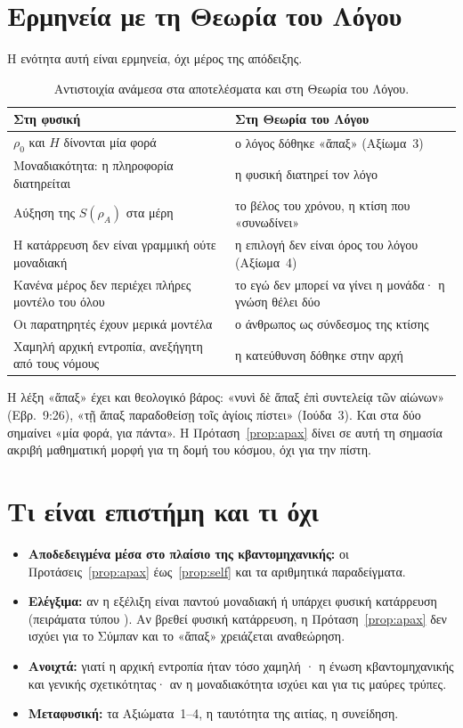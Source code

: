 \documentclass[a4paper,11pt]{article}
\theoremstyle{definition}
\begin{document}
\section{Ερμηνεία με τη Θεωρία του Λόγου}

Η ενότητα αυτή είναι ερμηνεία, όχι μέρος της απόδειξης.

\begin{table}[h]
\centering
\small
\begin{tabular}{>{\raggedright}p{} >{\raggedright\arraybackslash}p{}}
\toprule
\textbf{Στη φυσική} & \textbf{Στη Θεωρία του Λόγου} \\
\midrule
$\rho_0$ και $H$ δίνονται μία φορά & ο λόγος δόθηκε «ἅπαξ» (Αξίωμα~3) \\
Μοναδιακότητα: η πληροφορία διατηρείται & η φυσική διατηρεί τον λόγο \\
Αύξηση της $S(\rho_A)$ στα μέρη & το βέλος του χρόνου, η κτίση που «συνωδίνει» \\
Η κατάρρευση δεν είναι γραμμική ούτε μοναδιακή & η επιλογή δεν είναι όρος του λόγου (Αξίωμα~4) \\
Κανένα μέρος δεν περιέχει πλήρες μοντέλο του όλου & το εγώ δεν μπορεί να γίνει η μονάδα· η γνώση θέλει δύο \\
Οι παρατηρητές έχουν μερικά μοντέλα & ο άνθρωπος ως σύνδεσμος της κτίσης \\
Χαμηλή αρχική εντροπία, ανεξήγητη από τους νόμους & η κατεύθυνση δόθηκε στην αρχή \\
\bottomrule
\end{tabular}
\caption{Αντιστοιχία ανάμεσα στα αποτελέσματα και στη Θεωρία του Λόγου.}
\end{table}

Η λέξη «ἅπαξ» έχει και θεολογικό βάρος: «νυνὶ δὲ ἅπαξ ἐπὶ συντελείᾳ τῶν αἰώνων» (Εβρ.~9:26), «τῇ ἅπαξ παραδοθείσῃ τοῖς ἁγίοις πίστει» (Ιούδα~3). Και στα δύο σημαίνει «μία φορά, για πάντα». Η Πρόταση~\ref{prop:apax} δίνει σε αυτή τη σημασία ακριβή μαθηματική μορφή για τη δομή του κόσμου, όχι για την πίστη.

\section{Τι είναι επιστήμη και τι όχι}

\begin{itemize}
\item \textbf{Αποδεδειγμένα μέσα στο πλαίσιο της κβαντομηχανικής:} οι Προτάσεις~\ref{prop:apax} έως~\ref{prop:self} και τα αριθμητικά παραδείγματα.
\item \textbf{Ελέγξιμα:} αν η εξέλιξη είναι παντού μοναδιακή ή υπάρχει φυσική κατάρρευση (πειράματα τύπου \cite{donadi}). Αν βρεθεί φυσική κατάρρευση, η Πρόταση~\ref{prop:apax} δεν ισχύει για το Σύμπαν και το «ἅπαξ» χρειάζεται αναθεώρηση.
\item \textbf{Ανοιχτά:} γιατί η αρχική εντροπία ήταν τόσο χαμηλή \cite{penrose}· η ένωση κβαντομηχανικής και γενικής σχετικότητας· αν η μοναδιακότητα ισχύει και για τις μαύρες τρύπες.
\item \textbf{Μεταφυσική:} τα Αξιώματα~1--4, η ταυτότητα της αιτίας, η συνείδηση.
\end{itemize}
\end{document}

